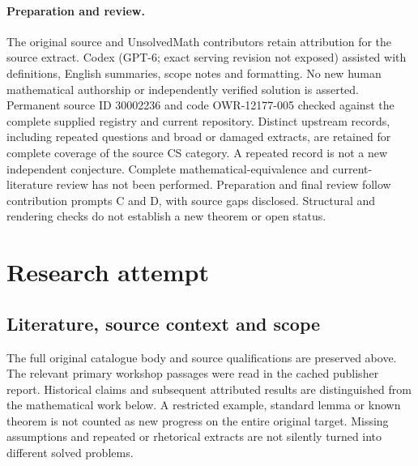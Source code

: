 \documentclass[11pt]{article}
\begin{document}
\paragraph{Preparation and review.}
The original source and UnsolvedMath contributors retain attribution for the source extract. Codex (GPT-6; exact serving revision not exposed) assisted with definitions, English summaries, scope notes and formatting. No new human mathematical authorship or independently verified solution is asserted. Permanent source ID 30002236 and code OWR-12177-005 checked against the complete supplied registry and current repository. Distinct upstream records, including repeated questions and broad or damaged extracts, are retained for complete coverage of the source CS category. A repeated record is not a new independent conjecture. Complete mathematical-equivalence and current-literature review has not been performed. Preparation and final review follow contribution prompts C and D, with source gaps disclosed. Structural and rendering checks do not establish a new theorem or open status.
\label{end:30002236}

\section{Research attempt}
\subsection{Literature, source context and scope}
The full original catalogue body and source qualifications are preserved above. The relevant primary workshop passages were read in the cached publisher report. Historical claims and subsequent attributed results are distinguished from the mathematical work below. A restricted example, standard lemma or known theorem is not counted as new progress on the entire original target. Missing assumptions and repeated or rhetorical extracts are not silently turned into different solved problems.
\end{document}

